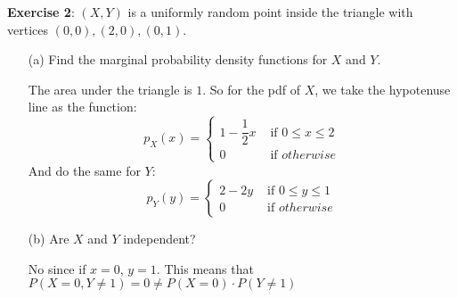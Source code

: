 \documentclass{article}
\begin{document}
\textbf{Exercise 2}: $(X, Y)$ is a uniformly random point inside the triangle with vertices $(0, 0), (2, 0), (0, 1)$.
    \begin{itemize}
        \item [(a)] Find the marginal probability density functions for $X$ and $Y$.
            \begin{answer}
                The area under the triangle is $1$. So for the pdf of $X$, we take the hypotenuse line as the function:
                    \begin{equation*}
                        p_{X}(x) = \begin{cases}
                            1 - \dfrac{1}{2}x &\text{ if } 0 \leq x \leq 2 \\
                            0 &\text{ if } otherwise           
                        \end{cases}
                    \end{equation*}
                And do the same for $Y$:
                    \begin{equation*}
                        p_{Y}(y) = \begin{cases}
                            2 - 2y    &\text{ if } 0 \leq y \leq 1 \\
                            0 &\text{ if } otherwise   
                        \end{cases}
                    \end{equation*}
            \end{answer}

        \item [(b)] Are $X$ and $Y$ independent? 
            \begin{answer}
                No since if $x = 0$, $y = 1$. This means that $P(X = 0, Y \neq 1) = 0 \neq P(X = 0) \cdot P(Y \neq 1)$
            \end{answer}
    \end{itemize}

\newpage
\end{document}
